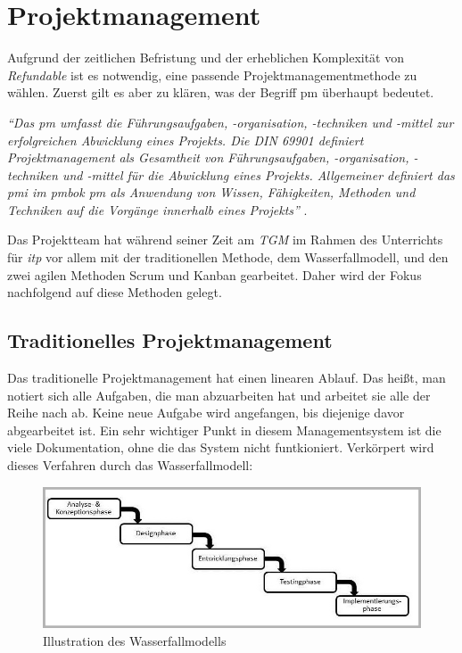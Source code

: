 \chapter{Projektmanagement}
Aufgrund der zeitlichen Befristung und der erheblichen Komplexität von \textit{Refundable} ist es notwendig, eine passende Projektmanagementmethode zu wählen. Zuerst gilt es aber zu klären, was der Begriff \Gls{pm} überhaupt bedeutet.\\
\begin{center}
	\textit{\enquote{Das \Gls{pm} umfasst die Führungsaufgaben, -organisation, -techniken und -mittel zur erfolgreichen Abwicklung eines Projekts. Die DIN 69901 definiert Projektmanagement als Gesamtheit von Führungsaufgaben, -organisation, -techniken und -mittel für die Abwicklung eines Projekts. Allgemeiner definiert das \Gls{pmi} im \Gls{pmbok} \Gls{pm} als Anwendung von Wissen, Fähigkeiten, Methoden und Techniken auf die Vorgänge innerhalb eines Projekts}} \cite{pm-definition}.
\end{center}
Das Projektteam hat während seiner Zeit am \textit{TGM} im Rahmen des Unterrichts für \textit{\Gls{itp}} vor allem mit der traditionellen Methode, dem Wasserfallmodell, und den zwei agilen Methoden Scrum und Kanban gearbeitet. Daher wird der Fokus nachfolgend auf diese Methoden gelegt.
\newpage
\section{Traditionelles Projektmanagement}
\label{chapter:tradi-pm}
Das traditionelle Projektmanagement hat einen linearen Ablauf. Das heißt, man notiert sich alle Aufgaben, die man abzuarbeiten hat und arbeitet sie alle der Reihe nach ab. Keine neue Aufgabe wird angefangen, bis diejenige davor abgearbeitet ist. Ein sehr wichtiger Punkt in diesem Managementsystem ist die viele Dokumentation, ohne die das System nicht funtkioniert. Verkörpert wird dieses Verfahren durch das Wasserfallmodell:
\begin{figure}[H]
	\centering
	\includegraphics[width=0.6\linewidth]{images/projektmanagement/wasserfallmodell}
	\caption[Wasserfallmodell]{Illustration des Wasserfallmodells \cite{pm-wasserfall-online}}
	\label{fig:wasserfall}
\end{figure}
